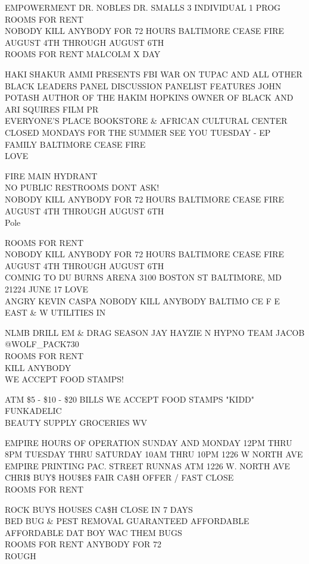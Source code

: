 \documentclass[10pt,letterpaper]{article}
\begin{document}
EMPOWERMENT DR. NOBLES DR. SMALLS 3 INDIVIDUAL 1 PROG\\
ROOMS FOR RENT\\
NOBODY KILL ANYBODY FOR 72 HOURS BALTIMORE CEASE FIRE AUGUST 4TH THROUGH AUGUST 6TH\\
ROOMS FOR RENT MALCOLM X DAY

HAKI SHAKUR AMMI PRESENTS FBI WAR ON TUPAC AND ALL OTHER BLACK LEADERS PANEL DISCUSSION PANELIST FEATURES JOHN POTASH AUTHOR OF THE HAKIM HOPKINS OWNER OF BLACK AND ARI SQUIRES FILM PR\\
EVERYONE'S PLACE BOOKSTORE \& AFRICAN CULTURAL CENTER\\
CLOSED MONDAYS FOR THE SUMMER SEE YOU TUESDAY {-} EP FAMILY BALTIMORE CEASE FIRE\\
LOVE

FIRE MAIN HYDRANT\\
NO PUBLIC RESTROOMS DONT ASK!\\
NOBODY KILL ANYBODY FOR 72 HOURS BALTIMORE CEASE FIRE AUGUST 4TH THROUGH AUGUST 6TH\\
Pole

ROOMS FOR RENT\\
NOBODY KILL ANYBODY FOR 72 HOURS BALTIMORE CEASE FIRE AUGUST 4TH THROUGH AUGUST 6TH\\
COMNIG TO DU BURNS ARENA 3100 BOSTON ST BALTIMORE, MD 21224 JUNE 17 LOVE\\
ANGRY KEVIN CASPA NOBODY KILL ANYBODY BALTIMO CE F E EAST \& W UTILITIES IN

NLMB DRILL EM \& DRAG SEASON JAY HAYZIE N HYPNO TEAM JACOB @WOLF\_PACK730\\
ROOMS FOR RENT\\
KILL ANYBODY\\
WE ACCEPT FOOD STAMPS!

ATM \$5 {-} \$10 {-} \$20 BILLS WE ACCEPT FOOD STAMPS "KIDD" FUNKADELIC\\
BEAUTY SUPPLY GROCERIES WV

EMPIRE HOURS OF OPERATION SUNDAY AND MONDAY 12PM THRU 8PM TUESDAY THRU SATURDAY 10AM THRU 10PM 1226 W NORTH AVE\\
EMPIRE PRINTING PAC. STREET RUNNAS ATM 1226 W. NORTH AVE\\
CHRI\$ BUY\$ HOU\$E\$ FAIR CA\$H OFFER / FAST CLOSE\\
ROOMS FOR RENT

ROCK BUYS HOUSES CA\$H CLOSE IN 7 DAYS\\
BED BUG \& PEST REMOVAL GUARANTEED AFFORDABLE AFFORDABLE DAT BOY WAC THEM BUGS\\
ROOMS FOR RENT ANYBODY FOR 72\\
ROUGH
\end{document}
